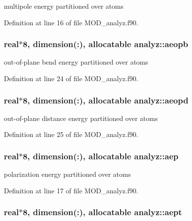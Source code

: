 multipole energy partitioned over atoms 



Definition at line 16 of file M\-O\-D\-\_\-analyz.\-f90.

\hypertarget{classanalyz_a8433635543cd9863396246887a452619}{
\subsubsection[{aeopb}]{\setlength{\rightskip}{0pt plus 5cm}real$\ast$8, dimension(\-:), allocatable analyz\-::aeopb}}\label{classanalyz_a8433635543cd9863396246887a452619}


out-\/of-\/plane bend energy partitioned over atoms 



Definition at line 24 of file M\-O\-D\-\_\-analyz.\-f90.

\hypertarget{classanalyz_ad0b333412711890551fc2dc1fa0c4dbb}{
\subsubsection[{aeopd}]{\setlength{\rightskip}{0pt plus 5cm}real$\ast$8, dimension(\-:), allocatable analyz\-::aeopd}}\label{classanalyz_ad0b333412711890551fc2dc1fa0c4dbb}


out-\/of-\/plane distance energy partitioned over atoms 



Definition at line 25 of file M\-O\-D\-\_\-analyz.\-f90.

\hypertarget{classanalyz_a3666f68e7b39a56e10a22329fc53f77c}{
\subsubsection[{aep}]{\setlength{\rightskip}{0pt plus 5cm}real$\ast$8, dimension(\-:), allocatable analyz\-::aep}}\label{classanalyz_a3666f68e7b39a56e10a22329fc53f77c}


polarization energy partitioned over atoms 



Definition at line 17 of file M\-O\-D\-\_\-analyz.\-f90.

\hypertarget{classanalyz_adc598ba1a8b6819a2f05b464e8bad797}{
\subsubsection[{aept}]{\setlength{\rightskip}{0pt plus 5cm}real$\ast$8, dimension(\-:), allocatable analyz\-::aept}}\label{classanalyz_adc598ba1a8b6819a2f05b464e8bad797}


